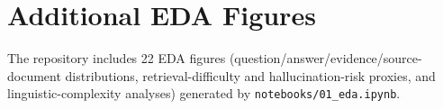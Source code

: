 \documentclass[11pt]{article}
\begin{document}



\appendix
\section{Additional EDA Figures}
The repository includes 22 EDA figures (question/answer/evidence/source-document
distributions, retrieval-difficulty and hallucination-risk proxies, and
linguistic-complexity analyses) generated by \texttt{notebooks/01\_eda.ipynb}.
\end{document}
